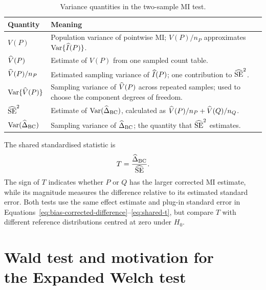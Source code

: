\begin{table}[H]
\centering
\caption{Variance quantities in the two-sample MI test.}
\label{tab:results-variance-quantities}
\thesistableformat
\begin{tabularx}{\textwidth}{@{}l>{\raggedright\arraybackslash}X@{}}
\toprule
\textbf{Quantity} & \textbf{Meaning}\\
\midrule
\(V(P)\) & Population variance of pointwise MI; \(V(P)/n_P\)
approximates \(\operatorname{Var}\{\widehat I(P)\}\).\\
\addlinespace
\(\widehat V(P)\) & Estimate of \(V(P)\) from one sampled count table.\\
\addlinespace
\(\widehat V(P)/n_P\) & Estimated sampling variance of \(\widehat I(P)\);
one contribution to \(\widehat{\operatorname{SE}}^2\).\\
\addlinespace
\(\operatorname{Var}\{\widehat V(P)\}\) & Sampling variance of \(\widehat V(P)\) across repeated samples;
used to choose the component degrees of freedom.\\
\addlinespace
\(\widehat{\operatorname{SE}}^2\) & Estimate of \(\operatorname{Var}(\widehat\Delta_{\mathrm{BC}})\), calculated as
\(\widehat V(P)/n_P+\widehat V(Q)/n_Q\).\\
\addlinespace
\(\operatorname{Var}(\widehat\Delta_{\mathrm{BC}})\) & Sampling variance of \(\widehat\Delta_{\mathrm{BC}}\); the quantity
that \(\widehat{\operatorname{SE}}^2\) estimates.\\
\bottomrule
\end{tabularx}
\end{table}

The shared standardised statistic is
\begin{equation}
  T=\frac{\widehat\Delta_{\mathrm{BC}}}{\widehat{\operatorname{SE}}}.
  \label{eq:shared-t}
\end{equation}
The sign of \(T\) indicates whether \(P\) or \(Q\) has the larger
corrected MI estimate, while its magnitude measures the difference relative
to its estimated standard error. Both tests use the same effect estimate
and plug-in standard error in
Equations~\eqref{eq:bias-corrected-difference}--\eqref{eq:shared-t}, but
compare \(T\) with different reference distributions centred at zero
under \(H_0\).

\section[Wald test and motivation for the Expanded Welch test]{Wald test and motivation for\\the Expanded Welch test}

